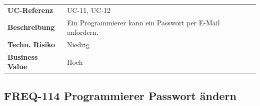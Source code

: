 \begin{longtable}[c]{@{}ll@{}}
\toprule
\begin{minipage}[t]{0.20\columnwidth}\raggedright\strut
\textbf{UC-Referenz}
\strut\end{minipage} &
\begin{minipage}[t]{0.74\columnwidth}\raggedright\strut
UC-11, UC-12
\strut\end{minipage}\tabularnewline
\begin{minipage}[t]{0.20\columnwidth}\raggedright\strut
\textbf{Beschreibung}
\strut\end{minipage} &
\begin{minipage}[t]{0.74\columnwidth}\raggedright\strut
Ein Programmierer kann ein Passwort per E-Mail anfordern.
\strut\end{minipage}\tabularnewline
\begin{minipage}[t]{0.20\columnwidth}\raggedright\strut
\textbf{Techn. Risiko}
\strut\end{minipage} &
\begin{minipage}[t]{0.74\columnwidth}\raggedright\strut
Niedrig
\strut\end{minipage}\tabularnewline
\begin{minipage}[t]{0.20\columnwidth}\raggedright\strut
\textbf{Business Value}
\strut\end{minipage} &
\begin{minipage}[t]{0.74\columnwidth}\raggedright\strut
Hoch
\strut\end{minipage}\tabularnewline
\bottomrule
\end{longtable}

\subsection{FREQ-114 Programmierer Passwort
ändern}\label{freq-114-programmierer-passwort-uxe4ndern}

